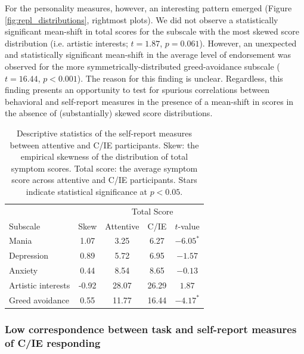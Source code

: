 \documentclass[a4paper,notitlepage,12pt]{article}
\begin{document}
\begin{refsection}[supp]
For the personality measures, however, an interesting pattern emerged (Figure \ref{fig:repl_distributions}, rightmost plots). We did not observe a statistically significant mean-shift in total scores for the subscale with the most skewed score distribution (i.e. artistic interests; $t = 1.87$, $p = 0.061$). However, an unexpected and statistically significant mean-shift in the average level of endorsement was observed for the more symmetrically-distributed greed-avoidance subscale ($t = 16.44$, $p < 0.001$). The reason for this finding is unclear. Regardless, this finding presents an opportunity to test for spurious correlations between behavioral and self-report measures in the presence of a mean-shift in scores in the absence of (substantially) skewed score distributions. 

\begin{table}[!t]
\centering
\small
\begin{tabular}{lcccc}
\toprule
& & \multicolumn{3}{c}{Total Score} \\
\cmidrule(lr){3-5}
Subscale & Skew &  Attentive & C/IE & $t$-value \\
\midrule
Mania      &  1.07 &   3.25 &   6.27 & $-6.05^*$ \\
Depression &  0.89 &   5.72 &   6.95 & $-1.57$   \\
Anxiety    &  0.44 &   8.54 &   8.65 & $-0.13$   \\
Artistic interests   & -0.92 &  28.07 &  26.29 & $1.87$    \\
Greed avoidance     &  0.55 &  11.77 &  16.44 & $-4.17^*$  \\
\bottomrule
\end{tabular}
\captionsetup{width=0.88\textwidth}
\caption{Descriptive statistics of the self-report measures between attentive and C/IE participants. Skew: the empirical skewness of the distribution of total symptom scores. Total score: the average symptom score across attentive and C/IE participants. Stars indicate statistical significance at $p<0.05$.}
\label{tab:rep_validation}
\end{table}

\subsubsection*{Low correspondence between task and self-report measures of C/IE responding}


\end{refsection}
\end{document}
